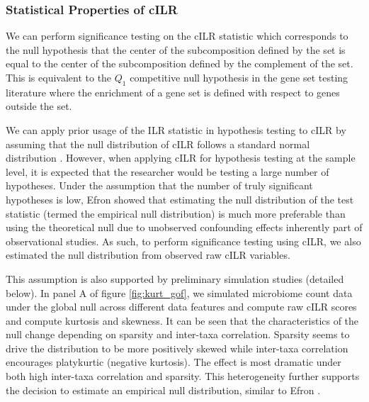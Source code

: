 \documentclass{article}
\begin{document}
\subsubsection*{Statistical Properties of cILR}
We can perform significance testing on the cILR statistic which corresponds to the null hypothesis that the center of the subcomposition defined by the set is equal to the center of the subcomposition defined by the complement of the set. This is equivalent to the $Q_1$ competitive null hypothesis in the gene set testing literature \cite{tian2005} where the enrichment of a gene set is defined with respect to genes outside the set. 

We can apply prior usage of the ILR statistic in hypothesis testing to cILR by assuming that the null distribution of cILR follows a standard normal distribution \cite{egozcue2005}. However, when applying cILR for hypothesis testing at the sample level, it is expected that the researcher would be testing a large number of hypotheses. Under the assumption that the number of truly significant hypotheses is low, Efron \cite{efron2004} showed that estimating the null distribution of the test statistic (termed the empirical null distribution) is much more preferable than using the theoretical null due to unobserved confounding effects inherently part of observational studies. As such, to perform significance testing using cILR, we also estimated the null distribution from observed raw cILR variables. 

This assumption is also supported by preliminary simulation studies (detailed below). In panel A of figure \ref{fig:kurt_gof}, we simulated microbiome count data under the global null across different data features and compute raw cILR scores and compute kurtosis and skewness. It can be seen that the characteristics of the null change depending on sparsity and inter-taxa correlation. Sparsity seems to drive the distribution to be more positively skewed while inter-taxa correlation encourages platykurtic (negative kurtosis). The effect is most dramatic under both high inter-taxa correlation and sparsity. This heterogeneity further supports the decision to estimate an empirical null distribution, similar to Efron \cite{efron2004}. 
\end{document}
